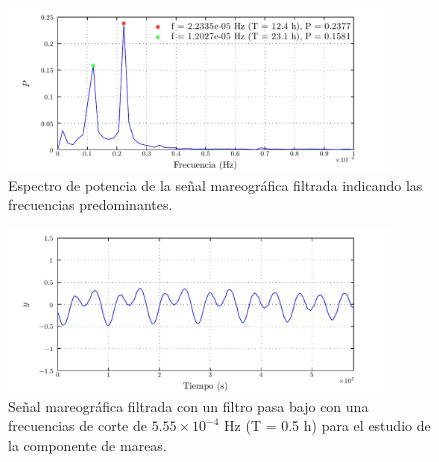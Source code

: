 \documentclass[a4paper,12pt,final]{article}
\begin{document}
      \newpage
      \begin{figure}[H]
        \begin{center}
          \caption{Espectro de potencia de la señal mareográfica filtrada indicando las frecuencias predominantes.}
          \label{p3f4}
          \vspace{-1em}
          \includegraphics[width=0.9\textwidth]{./laboratorio_5/problema03_power_spectrum.pdf}
        \end{center}
      \end{figure}
      \vspace{-0.25em}

      \begin{figure}[H]
        \begin{center}
          \caption{Señal mareográfica filtrada con un filtro pasa bajo con una frecuencias de corte de $5.55\times10^{-4}$ Hz (T = 0.5 h) para el estudio de la componente de mareas.}
          \label{p3f5}
          \vspace{-1em}
          \includegraphics[width=0.9\textwidth]{./laboratorio_5/problema03_signal_tidal.pdf}
        \end{center}
      \end{figure}
      \vspace{-0.25em}
\end{document}
